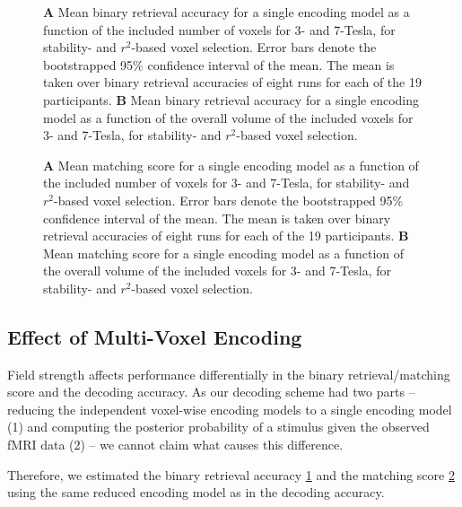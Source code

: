 \begin{figure}
  \centering
  \def\svgwidth{\linewidth}
  
	
  \caption{\textbf{A} Mean binary retrieval accuracy for a single encoding model as a function of the included number of
  voxels for 3- and 7-Tesla, for stability- and $r^2$-based voxel selection. Error bars denote the bootstrapped 95\% confidence
  interval of the mean. The mean is taken over binary retrieval accuracies of
  eight runs for each of the 19 participants. \textbf{B} Mean binary retrieval
  accuracy for a single encoding model as a function of the overall volume of
	  the included voxels for 3- and 7-Tesla, for stability- and $r^2$-based voxel selection.}

\label{fig:binary_retrieval_mve}
\end{figure}

\begin{figure}
  \centering
  \def\svgwidth{\linewidth}
  
	
  \caption{\textbf{A} Mean matching score for a single encoding model as a function of the included number of
  voxels for 3- and 7-Tesla, for stability- and $r^2$-based voxel selection. Error bars denote the bootstrapped 95\% confidence
  interval of the mean. The mean is taken over binary retrieval accuracies of
  eight runs for each of the 19 participants. \textbf{B} Mean matching score for a single encoding model as a function of the overall volume of
	  the included voxels for 3- and 7-Tesla, for stability- and $r^2$-based voxel selection.}

 \label{fig:matching_score_mve}
\end{figure}

\subsection*{Effect of Multi-Voxel Encoding}

Field strength affects performance differentially in the binary
retrieval/matching score and the decoding accuracy. As our decoding scheme
had two parts -- reducing the independent voxel-wise encoding models to a single
encoding model (1) and computing the posterior probability of a stimulus given
the observed f{MRI} data (2) -- we cannot claim what causes this difference.

Therefore, we estimated the binary retrieval accuracy
\ref{fig:binary_retrieval_mve} and the matching score
\ref{fig:matching_score_mve} using the same reduced encoding model as in the decoding accuracy.


